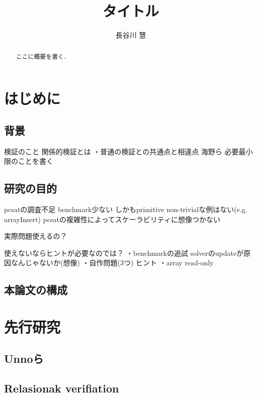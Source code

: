 \documentclass[uplatex]{suribt}
\title{タイトル}
\author{長谷川 慧}
\begin{document}
\maketitle%

\frontmatter%
\begin{abstract}%
 ここに概要を書く．
\end{abstract}

\tableofcontents%

\mainmatter%
\chapter{はじめに}
\section{背景}
検証のこと
関係的検証とは
・普通の検証との共通点と相違点
海野ら 必要最小限のことを書く

\section{研究の目的}
pcsatの調査不足 
  benchmark少ない
  しかもprimitive
non-trivialな例はない(e.g. arrayInsert)
pcsatの複雑性によってスケーラビリティに想像つかない

実際問題使えるの？

使えないならヒントが必要なのでは？
・benchmarkの追試 solverのupdateが原因なんじゃないか(想像)
・自作問題(3つ) ヒント
・array read-only
\section{本論文の構成}
\section{}
\chapter{先行研究} %
\section{Unnoら}
\section{Relasionak verifiation}
\end{document}
